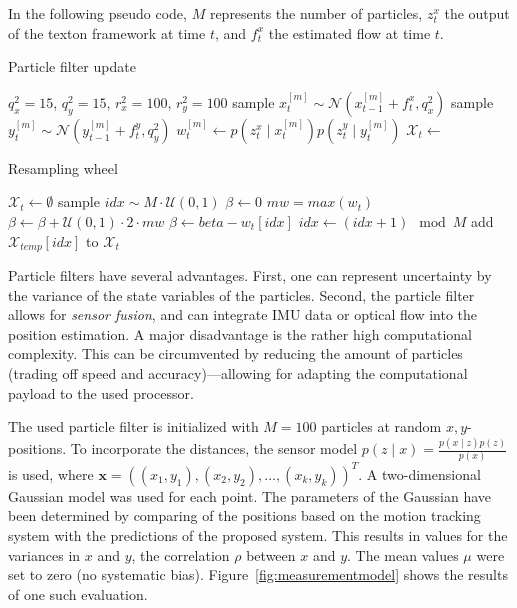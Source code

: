 \documentclass{report}
\begin{document}
In the following pseudo code, $M$ represents the number of particles,
$z_t^x$ the output of the texton framework at time $t$, and $f_t^x$
the estimated flow at time $t$.
\begin{algorithm}
\caption{Particle filter update}
\label{alg:particle_filter}
\begin{algorithmic}[1]
  \State $q_x^2 = 15$, $q_y^2 = 15$, $r_x^2 = 100$, $r_y^2 = 100$
  \State sample $x_t^{[m]} \sim \mathcal{N}(x_{t-1}^{[m]} + f_t^x, q_x^2)$
  \State sample $y_t^{[m]} \sim \mathcal{N}(y_{t-1}^{[m]} + f_t^y, q_y^2)$
  \State $w_t^{[m]} \gets p(z_t^x \mid x_t^{[m]}) p(z_t^y \mid y_t^{[m]})$
  \EndFor
  \State $\mathcal{X}_t \gets$ 
  \EndProcedure
\end{algorithmic}
\end{algorithm}

\begin{algorithm}
\caption{Resampling wheel}
\label{alg:resampling_wheel}
  \begin{algorithmic}[1]
    \State $\mathcal{X}_t \gets \emptyset$
    \State sample $idx \sim M\cdot\mathcal{U}(0, 1)$
    \State $\beta \gets 0$
    \State $mw = max(w_t)$
    \State $\beta \gets \beta + \mathcal{U}(0, 1)\cdot 2\cdot mw$
    \State $\beta \gets beta - w_t[idx]$
    \State $idx \gets (idx + 1) \mod M$
    \EndWhile
    \State add $\mathcal{X}_{temp}[idx]$ to $\mathcal{X}_t$
    \EndFor
\EndProcedure
\end{algorithmic}
\end{algorithm}

Particle filters have several advantages. First, one can represent
uncertainty by the variance of the state variables of the
particles. Second, the particle filter allows for \emph{sensor
  fusion}, and can integrate IMU data or optical flow into the
position estimation.  A major disadvantage is the rather high
computational complexity. This can be circumvented by reducing the
amount of particles (trading off speed and accuracy)---allowing for
adapting the computational payload to the used processor.

The used particle filter is initialized with $M = 100$ particles at
random $x, y$-positions. To incorporate the distances, the sensor
model $p(z \mid x) = \frac{p(x \mid z)p(z)}{p(x)}$ is used, where
$\textbf{x} = ((x_1, y_1), (x_2, y_2), \ldots, (x_k, y_k))^T$. A
two-dimensional Gaussian model was used for each point. The parameters
of the Gaussian have been determined by comparing of the positions
based on the motion tracking system with the predictions of the
proposed system. This results in values for the variances in $x$ and
$y$, the correlation $\rho$ between $x$ and $y$. The mean values $\mu$
were set to zero (no systematic
bias). Figure~\ref{fig:measurementmodel} shows the results of one such
evaluation.
\end{document}
